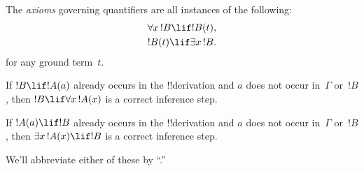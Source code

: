 \documentclass[../../../include/open-logic-section]{subfiles}
\begin{document}


\begin{defn}
The \emph{axioms} governing quantifiers are
all instances of the following:
\begin{align}
\ollabel{ax:q1} & \lforall[x][!B] \lif !B(t), \\
\ollabel{ax:q2} & !B(t) \lif \lexists[x][!B].
\end{align}
for any ground term~$t$.
\end{defn}

\begin{defn}
\item If $!B \lif !A(a)$ already occurs in the !!{derivation} and $a$
  does not occur in~$\Gamma$ or~$!B$, then $!B \lif
  \lforall[x][!A(x)]$ is a correct inference step.
\item If $!A(a) \lif !B$ already occurs in the !!{derivation} and $a$
  does not occur in~$\Gamma$ or~$!B$, then $\lexists[x][!A(x)] \lif
  !B$ is a correct inference step.
\end{defn}

We'll abbreviate either of these by ``\QR.''
\end{document}
